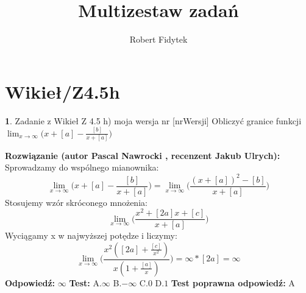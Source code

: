 \documentclass[12pt, a4paper]{article}
\title{Multizestaw zadań}
\author{Robert Fidytek}
\date{}
\theoremstyle{definition} %
\newtheorem{zad}{}
\newcommand{\kategoria}[1]{\section{#1}} %
\newcommand{\zadStart}[1]{\begin{zad}#1\newline} %
\newcommand{\zadStop}{\end{zad}}   %
\newcommand{\rozwStart}[2]{\noindent \textbf{Rozwiązanie (autor #1 , recenzent #2): }\newline} %
\newcommand{\rozwStop}{\newline}                                            %
\newcommand{\odpStart}{\noindent \textbf{Odpowiedź:}\newline}    %
\newcommand{\odpStop}{\newline}                                             %
\newcommand{\testStart}{\noindent \textbf{Test:}\newline} %
\newcommand{\testStop}{\newline} %
\newcommand{\kluczStart}{\noindent \textbf{Test poprawna odpowiedź:}\newline} %
\newcommand{\kluczStop}{\newline} %
\begin{document}
\maketitle


\kategoria{Wikieł/Z4.5h}
\zadStart{Zadanie z Wikieł Z 4.5 h) moja wersja nr [nrWersji]}
Obliczyć granice funkcji $\displaystyle{\lim_{x \to \infty}}\big(x+[a]-\frac{[b]}{x+[a]}\big)$
\zadStop
\rozwStart{Pascal Nawrocki}{Jakub Ulrych}
Sprowadzamy do wspólnego mianownika:
$$\displaystyle{\lim_{x \to \infty}}\big(x+[a]-\frac{[b]}{x+[a]}\big)=\displaystyle{\lim_{x \to \infty}}\big(\frac{(x+[a])^2-[b]}{x+[a]}\big)$$
Stosujemy wzór skróconego mnożenia:
$$\displaystyle{\lim_{x \to \infty}}\big(\frac{x^2+[2a]x+[c]}{x+[a]}\big)$$
Wyciągamy x w najwyższej potędze i liczymy:
$$\displaystyle{\lim_{x \to \infty}}\big(\frac{x^2([2a]+\frac{[c]}{x^2})}{x(1+\frac{[a]}{x})}\big)=\infty*[2a]=\infty$$
\rozwStop
\odpStart
$\infty$
\odpStop
\testStart
A.$\infty$
B.$-\infty$
C.$0$
D.$1$
\testStop
\kluczStart
A
\kluczStop
\end{document}
